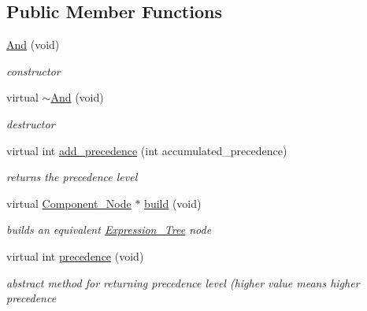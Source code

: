 \subsection*{Public Member Functions}
\begin{DoxyCompactItemize}
\item 
\hyperlink{classMadara_1_1Expression__Tree_1_1And_a5d3a2692bc337d2ae38da0b769faa2b9}{And} (void)
\begin{DoxyCompactList}\small\item\em constructor \item\end{DoxyCompactList}\item 
virtual \hyperlink{classMadara_1_1Expression__Tree_1_1And_acf0e8fc7b7d86ef61b341f05941b11a1}{$\sim$And} (void)
\begin{DoxyCompactList}\small\item\em destructor \item\end{DoxyCompactList}\item 
virtual int \hyperlink{classMadara_1_1Expression__Tree_1_1And_a1b69eb5e4b266406651e3aba9c7557ae}{add\_\-precedence} (int accumulated\_\-precedence)
\begin{DoxyCompactList}\small\item\em returns the precedence level \item\end{DoxyCompactList}\item 
virtual \hyperlink{classMadara_1_1Expression__Tree_1_1Component__Node}{Component\_\-Node} $\ast$ \hyperlink{classMadara_1_1Expression__Tree_1_1And_ad5373c86239332255faa0e0cd32a65b1}{build} (void)
\begin{DoxyCompactList}\small\item\em builds an equivalent \hyperlink{classMadara_1_1Expression__Tree_1_1Expression__Tree}{Expression\_\-Tree} node \item\end{DoxyCompactList}\item 
virtual int \hyperlink{classMadara_1_1Expression__Tree_1_1Symbol_ac060dedb8d16864591b259df375109b3}{precedence} (void)
\begin{DoxyCompactList}\small\item\em abstract method for returning precedence level (higher value means higher precedence \item\end{DoxyCompactList}\end{DoxyCompactItemize}
